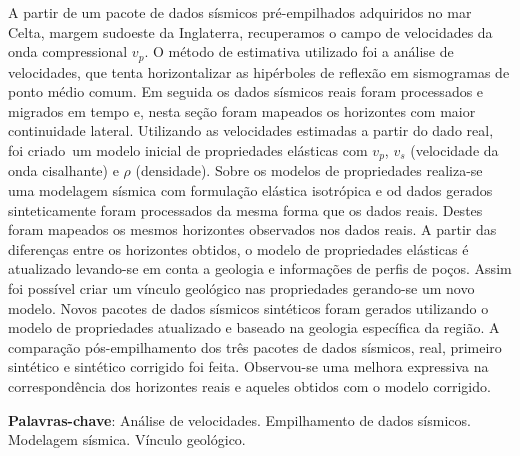 \documentclass[
	12pt,				%
	openright,			%
	oneside,			%
	a4paper,			%
	english,			%
	brazil				%
	]{abntex2}
\begin{document}
\begin{epigrafe}
	
\end{epigrafe}

\setlength{\absparsep}{18pt} %
    \begin{resumo}		

		A partir de um pacote de dados sísmicos pré-empilhados adquiridos no mar Celta, margem sudoeste da Inglaterra, recuperamos o campo de velocidades da onda compressional $v_p$. O método de estimativa utilizado foi a análise de velocidades, que tenta horizontalizar as hipérboles de reflexão em sismogramas de ponto médio comum. Em seguida os dados sísmicos reais foram processados e migrados em tempo e, nesta seção foram mapeados os horizontes com maior continuidade lateral. Utilizando as velocidades estimadas a partir do dado real, foi criado um modelo inicial de propriedades elásticas com $v_p$, $v_s$ (velocidade da onda cisalhante) e $\rho$ (densidade). Sobre os modelos de propriedades realiza-se uma modelagem sísmica com formulação elástica isotrópica e od dados gerados sinteticamente foram processados da mesma forma que os dados reais. Destes foram mapeados os mesmos horizontes observados nos dados reais. A partir das diferenças entre os horizontes obtidos, o modelo de propriedades elásticas é atualizado levando-se em conta a geologia e informações de perfis de poços. Assim foi possível criar um vínculo geológico nas propriedades gerando-se um novo modelo. Novos pacotes de dados sísmicos sintéticos foram gerados utilizando o modelo de propriedades atualizado e baseado na geologia específica da região. A comparação pós-empilhamento dos três pacotes de dados sísmicos, real, primeiro sintético e sintético corrigido foi feita. Observou-se uma melhora expressiva na correspondência dos horizontes reais e aqueles obtidos com o modelo corrigido.

    \vspace{\onelineskip}
    \newline 
    \textbf{Palavras-chave}: Análise de velocidades. Empilhamento de dados sísmicos. Modelagem sísmica. Vínculo geológico.
\end{resumo}
\end{document}
